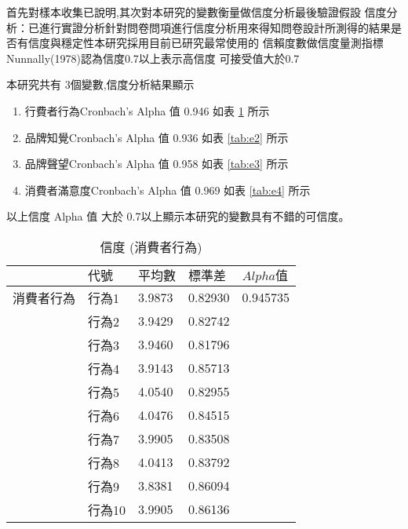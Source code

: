 首先對樣本收集已說明,其次對本研究的變數衡量做信度分析最後驗證假設
信度分析：已進行實證分析針對問卷問項進行信度分析用來得知問卷設計所測得的結果是否有信度與穩定性本研究採用目前已研究最常使用的 信賴度數做信度量測指標 Nunnally(1978)認為信度0.7以上表示高信度 可接受值大於0.7

本研究共有 3個變數,信度分析結果顯示
\begin{enumerate}
\item 行費者行為Cronbach's Alpha 值 0.946  如表 \ref{tab:e1}  所示
\item 品牌知覺Cronbach's Alpha 值 0.936  如表 \ref{tab:e2}  所示
\item 品牌聲望Cronbach's Alpha 值  0.958 如表 \ref{tab:e3}  所示
\item 消費者滿意度Cronbach's Alpha 值 0.969 如表 \ref{tab:e4}  所示
\end{enumerate}
以上信度 Alpha 值 大於 0.7以上顯示本研究的變數具有不錯的可信度。

\begin{table}[htb]
\caption{信度 (消費者行為)}
\label{tab:e1}
\renewcommand{\arraystretch}{1.2} %
\arrayrulewidth=1pt               %
\tabcolsep=18pt                   %
\begin{tabular}[t]{lllll}  %
\hline
 & $代號$& $平均數$ & $標準差$& $ Alpha 值 $ \\
\hline
消費者行為&行為1&3.9873&0.82930&0.945735\\
               &行為2&3.9429	&0.82742&\\	
               &行為3&3.9460&0.81796&\\
               &行為4&3.9143&0.85713&\\
               &行為5&4.0540&0.82955&\\
               &行為6&4.0476&0.84515&\\
               &行為7&3.9905&0.83508&\\
               &行為8&4.0413&0.83792&\\
               &行為9&3.8381&0.86094&\\
               &行為10&3.9905&0.86136&\\
\hline
\end{tabular}
\end{table}

